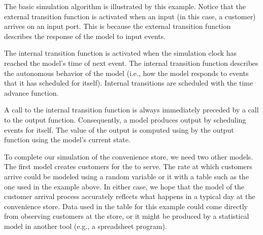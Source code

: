 The basic simulation algorithm is illustrated by this example. Notice that the external transition function is activated when an input (in this case, a customer) arrives on an input port. This is because the external transition function describes the response of the model to input events.

The internal transition function is activated when the simulation clock has reached the model's time of next event. The internal transition function describes the autonomous behavior of the model (i.e., how the model responds to events that it has scheduled for itself). Internal transitions are scheduled with the time advance function.

A call to the internal transition function is always immediately preceded by a call to the output function. Consequently, a model produces output by scheduling events for itself. The value of the output is computed using by the output function using the model's current state.

To complete our simulation of the convenience store, we need two other  models. The first model creates customers for the  to serve. The rate at which customers arrive could be modeled using a random variable or it with a table such as the one used in the example above. In either case, we hope that the model of the customer arrival process accurately reflects what happens in a typical day at the convenience store. Data used in the table for this example could come directly from observing customers at the store, or it might be produced by a statistical model in another tool (e.g., a spreadsheet program).

